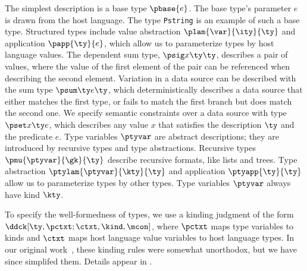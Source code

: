 The simplest description is a base type $\pbase{e}$.
The base type's parameter $e$ is drawn from the host language. 
The \padsml{} type {\tt Pstring} is an example of such a base type.
Structured types include value abstraction $\plam{\var}{\ity}{\ty}$
and application $\papp{\ty}{e}$, which allow us to parameterize types
by host language values. 
The dependent sum type, $\psig x \ty \ty$, describes a pair of values,
where the value of the first element of the pair can be referenced
when describing the second element.  Variation in a data source can be
described with the sum type $\psum \ty e \ty$, which deterministically
describes a data source that either matches the first type, or fails
to match the first branch but does match the second one.
We specify semantic constraints over a data source
with type $\pset x \ty e$, which describes any value $x$ that satisfies the
description $\ty$ and the predicate $e$. Type variables $\ptyvar$ are
abstract descriptions; they are introduced by recursive types and type
abstractions. Recursive types $\pmu{\ptyvar}{\gk}{\ty}$ describe
recursive formats, like lists and trees. Type abstraction
$\ptylam{\ptyvar}{\kty}{\ty}$ and application $\ptyapp{\ty}{\ty}$
allow us to parameterize types by other types.  Type variables $\ptyvar$
always have kind $\kty$.

To specify the well-formedness of types, 
we use a kinding judgment of the form
$\ddck[\ty,\pctxt;\ctxt,\kind,\mcon]$,
where $\pctxt$ maps type variables 
to kinds and $\ctxt$ maps host language value variables to host language 
types. In our original work~\cite{fisher+:next700ddl}, these kinding rules
were somewhat unorthodox, but we have since simplifed them.  
Details appear in .

